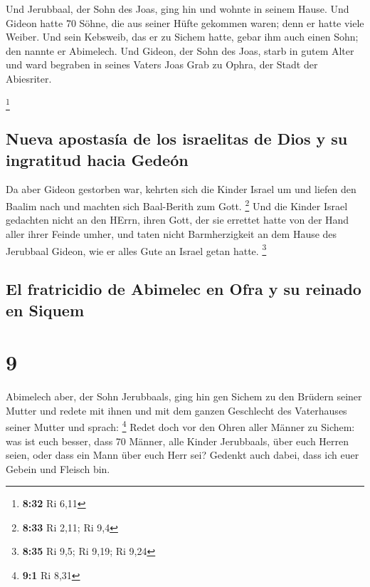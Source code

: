  Und Jerubbaal, der Sohn des Joas, ging hin und wohnte in
seinem Hause.  Und Gideon hatte 70 Söhne, die aus seiner
Hüfte gekommen waren; denn er hatte viele Weiber.  Und
sein Kebsweib, das er zu Sichem hatte, gebar ihm auch einen Sohn; den
nannte er Abimelech.  Und Gideon, der Sohn des Joas,
starb in gutem Alter und ward begraben in seines Vaters Joas Grab zu
Ophra, der Stadt der Abiesriter.

\footnote{\textbf{8:32} Ri 6,11}

\hypertarget{nueva-apostasuxeda-de-los-israelitas-de-dios-y-su-ingratitud-hacia-gedeuxf3n}{%
\subsection{Nueva apostasía de los israelitas de Dios y su ingratitud
hacia
Gedeón}\label{nueva-apostasuxeda-de-los-israelitas-de-dios-y-su-ingratitud-hacia-gedeuxf3n}}

 Da aber Gideon gestorben war, kehrten sich die Kinder
Israel um und liefen den Baalim nach und machten sich Baal-Berith zum
Gott. \footnote{\textbf{8:33} Ri 2,11; Ri 9,4}  Und die
Kinder Israel gedachten nicht an den HErrn, ihren Gott, der sie errettet
hatte von der Hand aller ihrer Feinde umher,  und taten
nicht Barmherzigkeit an dem Hause des Jerubbaal Gideon, wie er alles
Gute an Israel getan hatte. \footnote{\textbf{8:35} Ri 9,5; Ri 9,19; Ri
  9,24}

\hypertarget{el-fratricidio-de-abimelec-en-ofra-y-su-reinado-en-siquem}{%
\subsection{El fratricidio de Abimelec en Ofra y su reinado en
Siquem}\label{el-fratricidio-de-abimelec-en-ofra-y-su-reinado-en-siquem}}

\hypertarget{section-8}{%
\section{9}\label{section-8}}

 Abimelech aber, der Sohn Jerubbaals, ging hin gen Sichem
zu den Brüdern seiner Mutter und redete mit ihnen und mit dem ganzen
Geschlecht des Vaterhauses seiner Mutter und sprach: \footnote{\textbf{9:1}
  Ri 8,31}  Redet doch vor den Ohren aller Männer zu
Sichem: was ist euch besser, dass 70 Männer, alle Kinder Jerubbaals,
über euch Herren seien, oder dass ein Mann über euch Herr sei? Gedenkt
auch dabei, dass ich euer Gebein und Fleisch bin.

